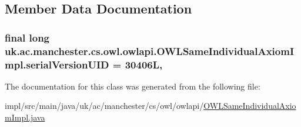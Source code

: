 \subsection{Member Data Documentation}
\hypertarget{classuk_1_1ac_1_1manchester_1_1cs_1_1owl_1_1owlapi_1_1_o_w_l_same_individual_axiom_impl_ad61ff4f3c1a6003f96a44c80a712fcd1}{
\subsubsection[{serial\-Version\-U\-I\-D}]{\setlength{\rightskip}{0pt plus 5cm}final long uk.\-ac.\-manchester.\-cs.\-owl.\-owlapi.\-O\-W\-L\-Same\-Individual\-Axiom\-Impl.\-serial\-Version\-U\-I\-D = 30406\-L\hspace{0.3cm}{\ttfamily [static]}, {\ttfamily [private]}}}\label{classuk_1_1ac_1_1manchester_1_1cs_1_1owl_1_1owlapi_1_1_o_w_l_same_individual_axiom_impl_ad61ff4f3c1a6003f96a44c80a712fcd1}


The documentation for this class was generated from the following file\-:\begin{DoxyCompactItemize}
\item 
impl/src/main/java/uk/ac/manchester/cs/owl/owlapi/\hyperlink{_o_w_l_same_individual_axiom_impl_8java}{O\-W\-L\-Same\-Individual\-Axiom\-Impl.\-java}\end{DoxyCompactItemize}
